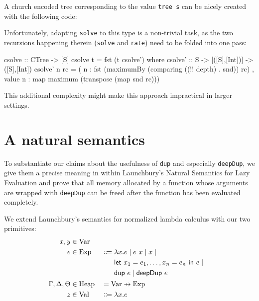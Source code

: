\documentclass[preprint]{sigplanconf}
\newcommand\pfun{\mathrel{\ooalign{\hfil$\mapstochar\mkern5mu$\hfil\cr$\to$\cr}}}
\theoremstyle{nonumberplain}
\newcommand{\li}{\lstinline[style=Haskell]}
\begin{document}
A church encoded tree corresponding to the value \li-tree s- can be nicely created with the following code:

Unfortunately, adapting \li-solve- to this type is a non-trivial task, as the two recursions happening therein (\li-solve- and \li-rate-) need to be folded into one pass:
\begin{haskell}
csolve :: CTree -> [S]
csolve t = fst (t csolve')
  where
  csolve' :: S -> [([S],[Int])] -> ([S],[Int])
  csolve' n rc = 
    ( n : fst (maximumBy (comparing ((!! depth) . snd)) rc)
    , value n : map maximum (transpose (map snd rc)))
\end{haskell}
This additional complexity might make this approach impractical in larger settings.


\section{A natural semantics}
\label{sec:semantics}

To substantiate our claims about the usefulness of \li-dup- and especially \li-deepDup-, we give them a precise meaning in within Launchbury’s Natural Semantics for Lazy Evaluation \citep{launchbury} and prove that all memory allocated by a function whose arguments are wrapped with \li-deepDup- can be freed after the function has been evaluated completely.

We extend Launchbury’s semantics for normalized lambda calculus with our two primitives:
\newcommand{\mdup}{\text{\textsf{dup}}}
\newcommand{\mdeepDup}{\text{\textsf{deepDup}}}
\newcommand{\sVar}{\text{Var}}
\newcommand{\sExp}{\text{Exp}}
\newcommand{\sHeap}{\text{Heap}}
\newcommand{\sVal}{\text{Val}}
\newcommand{\sApp}[2]{#1\ #2}
\newcommand{\sDup}[1]{\sApp \mdup #1}
\newcommand{\sDeepDup}[1]{\sApp \mdeepDup #1}
\newcommand{\sLet}[2]{\text{\textsf{let}}\ #1\ \text{\textsf{in}}\ #2}
\newcommand{\sred}[4]{#1 : #2 \Downarrow #3 : #4}
\newcommand{\sRule}[1]{\text{{\textsc{#1}}}}
\newcommand{\fv}[1]{\text{fv}(#1)}
\newcommand{\ufv}[1]{\text{ufv}(#1)}
\newcommand{\ur}[2]{\text{ur}_{#1}(#2)}
\newcommand{\dom}[1]{\text{dom}\,#1}
\begin{alignat*}{2}
x,y &\in \sVar \\
e &\in
\sExp &&\Coloneqq
\begin{aligned}[t]&
\lambda x . e
\mid \sApp e x
\mid x \mid
\\&
\sLet {x_1 = e_1,\ldots,x_n = e_n} e \mid
\\&
\sDup e \mid \sDeepDup e
\end{aligned}\\
\Gamma, \Delta, \Theta &\in \sHeap &&= \sVar \pfun \sExp \\
z &\in \sVal &&\Coloneqq \lambda x . e
\end{alignat*}
\end{document}
